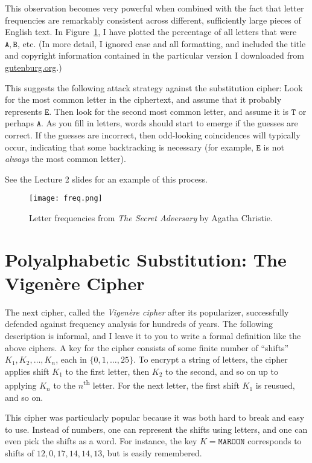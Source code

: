 \documentclass[11pt]{article}
\begin{document}
This observation becomes very powerful when combined with the fact that letter
frequencies are remarkably consistent across different, sufficiently large
pieces of English text. In Figure~\ref{fig:freq}, I have plotted the percentage
of all letters that were $\mathtt{A},\mathtt{B}$, etc. (In more detail, I
ignored case and all formatting, and included the title and copyright
information contained in the particular version I downloaded from
\url{gutenburg.org}.)

This suggests the following attack strategy against the substitution cipher:
Look for the most common letter in the ciphertext, and assume that it probably
represents $\mathtt{E}$. Then look for the second most common letter, and
assume it is $\mathtt{T}$ or perhaps $\mathtt{A}$. As you fill in letters,
words should start to emerge if the guesses are correct.  If the guesses are
incorrect, then odd-looking coincidences will typically occur, indicating that
some backtracking is necessary (for example, $\mathtt{E}$ is not \emph{always}
the most common letter). 

See the Lecture 2 slides for an example of this process.



\begin{figure}[t]
    \centering
\texttt{[image: freq.png]}
    \caption{Letter frequencies from \emph{The Secret Adversary} by Agatha
    Christie.}
    \label{fig:freq}
\end{figure}

\section{Polyalphabetic Substitution: The Vigen\`{e}re Cipher}

The next cipher, called the \emph{Vigen\`{e}re cipher} after its popularizer,
successfully defended against frequency analysis for hundreds of years. The
following description is informal, and I leave it to you to write a formal
definition like the above ciphers. A key for the cipher consists of some
finite number of ``shifts'' $K_1,K_2,\ldots,K_n$, each in $\{0,1,\ldots,25\}$.
To encrypt a string of letters, the cipher applies shift $K_1$ to the first
letter, then $K_2$ to the second, and so on up to applying $K_n$ to the
$n$\textsuperscript{th} letter. For the next letter, the first shift $K_1$
is reusued, and so on.

This cipher was particularly popular because it was both hard to break and easy
to use. Instead of numbers, one can represent the shifts using letters, and one
can even pick the shifts as a word. For instance, the key $K=\mathtt{MAROON}$
corresponds to shifts of $12,0,17,14,14,13$, but is easily remembered.
\end{document}
